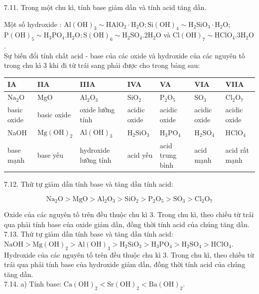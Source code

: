 \documentclass[10pt]{article}
\begin{document}
7.11. Trong một chu kì, tính base giảm dần và tính acid tăng dần.

Một số hydroxide : $\mathrm{Al}(\mathrm{OH})_{3} \sim \mathrm{HAlO}_{2} \cdot \mathrm{H}_{2} \mathrm{O} ; \mathrm{Si}(\mathrm{OH})_{4} \sim \mathrm{H}_{2} \mathrm{SiO}_{3} \cdot \mathrm{H}_{2} \mathrm{O}$; $\mathrm{P}(\mathrm{OH})_{5} \sim \mathrm{H}_{3} \mathrm{PO}_{4} . \mathrm{H}_{2} \mathrm{O} ; \mathrm{S}(\mathrm{OH})_{6} \sim \mathrm{H}_{2} \mathrm{SO}_{4} .2 \mathrm{H}_{2} \mathrm{O}$ và $\mathrm{Cl}(\mathrm{OH})_{7} \sim \mathrm{HClO}_{4} .3 \mathrm{H}_{2} \mathrm{O}$.\\
Sự biến đổi tính chất acid - base của các oxide và hydroxide của các nguyên tố trong chu kì 3 khi đi từ trái sang phải được cho trong bảng sau:

\begin{center}
\begin{tabular}{|l|l|l|l|l|l|l|}
\hline
IA & IIA & IIIA & IVA & VA & VIA & VIIA \\
\hline
$\mathrm{Na}_{2} \mathrm{O}$ & MgO & $\mathrm{Al}_{2} \mathrm{O}_{3}$ & $\mathrm{SiO}_{2}$ & $\mathrm{P}_{2} \mathrm{O}_{5}$ & $\mathrm{SO}_{3}$ & $\mathrm{Cl}_{2} \mathrm{O}_{7}$ \\
\hline
basic oxide & basic oxide & oxide lưỡng tính & acidic oxide & acidic oxide & acidic oxide & acidic oxide \\
\hline
NaOH & $\mathrm{Mg}(\mathrm{OH})_{2}$ & $\mathrm{Al}(\mathrm{OH})_{3}$ & $\mathrm{H}_{2} \mathrm{SiO}_{3}$ & $\mathrm{H}_{3} \mathrm{PO}_{4}$ & $\mathrm{H}_{2} \mathrm{SO}_{4}$ & $\mathrm{HClO}_{4}$ \\
\hline
base mạnh & base yếu & hydroxide lưỡng tính & acid yếu & acid trung bình & acid mạnh & acid rất mạnh \\
\hline
\end{tabular}
\end{center}

7.12. Thứ tự giảm dần tính base và tăng dần tính acid:

$$
\mathrm{Na}_{2} \mathrm{O}>\mathrm{MgO}>\mathrm{Al}_{2} \mathrm{O}_{3}>\mathrm{SiO}_{2}>\mathrm{P}_{2} \mathrm{O}_{5}>\mathrm{SO}_{3}>\mathrm{Cl}_{2} \mathrm{O}_{7}
$$

Oxide của các nguyên tố trên đều thuộc chu kì 3. Trong chu kì, theo chiều từ trái qua phải tính base của oxide giảm dần, đồng thời tính acid của chúng tăng dần.\\
7.13. Thứ tự giảm dần tính base và tăng dần tính acid:\\
$\mathrm{NaOH}>\mathrm{Mg}(\mathrm{OH})_{2}>\mathrm{Al}(\mathrm{OH})_{3}>\mathrm{H}_{2} \mathrm{SiO}_{3}>\mathrm{H}_{3} \mathrm{PO}_{4}>\mathrm{H}_{2} \mathrm{SO}_{4}>\mathrm{HClO}_{4}$.\\
Hydroxide của các nguyên tố trên đều thuộc chu kì 3. Trong chu kì, theo chiều từ trái qua phải tính base của hydroxide giảm dần, đồng thời tính acid của chúng tăng dần.\\
7.14. a) Tính base: $\mathrm{Ca}(\mathrm{OH})_{2}<\mathrm{Sr}(\mathrm{OH})_{2}<\mathrm{Ba}(\mathrm{OH})_{2}$.
\end{document}
